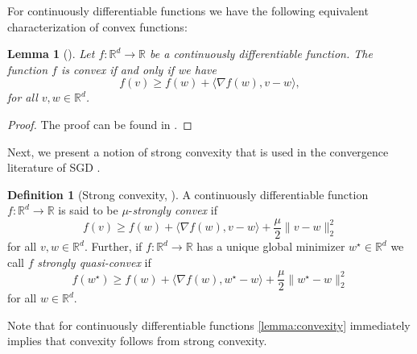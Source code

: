 \documentclass[12pt]{article}
\newtheorem{lemma}[lemma]{Lemma}
\theoremstyle{definition}
\newtheorem{definition}[definition]{Definition}
\numberwithin{equation}{section}
\newcommand{\R}{\mathbb{R}}
\newcommand{\norm}[1]{\lVert{#1}\rVert_2}
\begin{document}
For continuously differentiable functions we have the following equivalent characterization of convex functions:
\begin{lemma}[]
  \label{lemma:convexity}
  Let $f : \R^d \rightarrow \R$ be a continuously differentiable function. The function $f$ is convex if and only if we have
  \begin{equation*}
    f(v) \geq f(w) + \langle \nabla f(w), v-w \rangle,
  \end{equation*}
  for all $v,w \in \R^d$.
\end{lemma}
\begin{proof}
  The proof can be found in \autocite{boydConvexOptimization2004}.
\end{proof}

Next, we present a notion of strong convexity that is used in the convergence literature of SGD \autocite{sebbouhAlmostSureConvergence2021,moulinesNonAsymptoticAnalysisStochastic2011,bottouOptimizationMethodsLargeScale2018}. 
\begin{definition}[Strong convexity, ]
  A continuously differentiable function $f : \R^d \rightarrow \R$ is said to be $\mu$-\emph{strongly convex} if
  \begin{equation*}
    f(v) \geq f(w) + \langle \nabla f(w), v - w \rangle + \frac{\mu}{2} \norm{v - w}^2
  \end{equation*}
  for all $v, w \in \R^d$. Further, if $f : \R^d \rightarrow \R$ has a unique global minimizer $w^\star \in \R^d$ we call $f$ \emph{strongly quasi-convex} if
  \begin{equation*}
    f(w^\star) \geq f(w) + \langle \nabla f(w), w^\star - w \rangle + \frac{\mu}{2} \norm{w^\star - w}^2
  \end{equation*}
  for all $w \in \R^d$.
\end{definition}
Note that for continuously differentiable functions \autoref{lemma:convexity} immediately implies that convexity follows from strong convexity.
\end{document}
